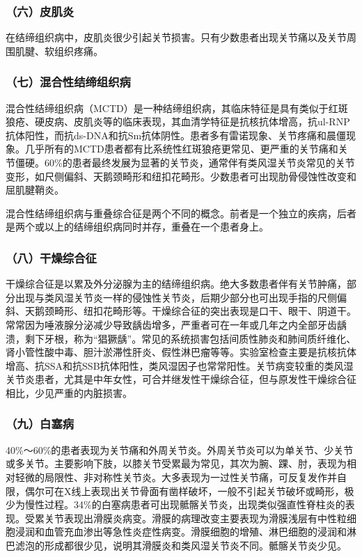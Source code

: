 \subsubsection{（六）皮肌炎}

在结缔组织病中，皮肌炎很少引起关节损害。只有少数患者出现关节痛以及关节周围肌腱、软组织疼痛。

\subsubsection{（七）混合性结缔组织病}

混合性结缔组织病（MCTD）是一种结缔组织病，其临床特征是具有类似于红斑狼疮、硬皮病、皮肌炎等的临床表现，其血清学特征是抗核抗体增高，抗ul-RNP抗体阳性，而抗ds-DNA和抗Sm抗体阴性。患者多有雷诺现象、关节疼痛和晨僵现象。几乎所有的MCTD患者都有比系统性红斑狼疮更常见、更严重的关节痛和关节僵硬。60\%的患者最终发展为显著的关节炎，通常伴有类风湿关节炎常见的关节变形，如尺侧偏斜、天鹅颈畸形和纽扣花畸形。少数患者可出现肋骨侵蚀性改变和屈肌腱鞘炎。

混合性结缔组织病与重叠综合征是两个不同的概念。前者是一个独立的疾病，后者是两个或以上的结缔组织病同时并存，重叠在一个患者身上。

\subsubsection{（八）干燥综合征}

干燥综合征是以累及外分泌腺为主的结缔组织病。绝大多数患者伴有关节肿痛，部分出现与类风湿关节炎一样的侵蚀性关节炎，后期少部分也可出现手指的尺侧偏斜、天鹅颈畸形、纽扣花畸形等。干燥综合征的突出表现是口干、眼干、阴道干。常常因为唾液腺分泌减少导致龋齿增多，严重者可在一年或几年之内全部牙齿龋溃，剩下牙根，称为“猖獗龋”。常见的系统损害包括间质性肺炎和肺间质纤维化、肾小管性酸中毒、胆汁淤滞性肝炎、假性淋巴瘤等等。实验室检查主要是抗核抗体增高、抗SSA和抗SSB抗体阳性，类风湿因子也常常阳性。关节病变较重的类风湿关节炎患者，尤其是中年女性，可合并继发性干燥综合征，但与原发性干燥综合征相比，少见严重的内脏损害。

\subsubsection{（九）白塞病}

40\%～60\%的患者表现为关节痛和外周关节炎。外周关节炎可以为单关节、少关节或多关节。主要影响下肢，以膝关节受累最为常见，其次为腕、踝、肘，表现为相对轻微的局限性、非对称性关节炎。大多表现为一过性关节痛，可反复发作并自限，偶尔可在X线上表现出关节骨面有凿样破坏，一般不引起关节破坏或畸形，极少为慢性过程。34\%的白塞病患者可出现骶髂关节炎，出现类似强直性脊柱炎的表现。受累关节表现出滑膜炎病变。滑膜的病理改变主要表现为滑膜浅层有中性粒细胞浸润和血管充血渗出等急性炎症性病变。滑膜细胞的增殖、淋巴细胞的浸润和淋巴滤泡的形成都很少见，说明其滑膜炎和类风湿关节炎不同。骶髂关节炎少见。

